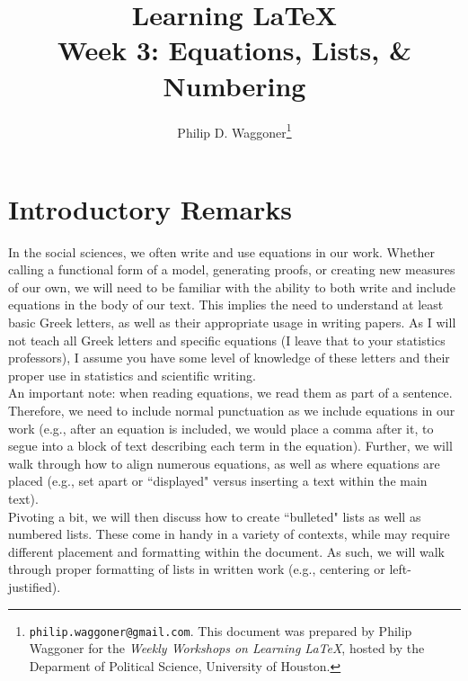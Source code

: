 \documentclass[11pt]{article}
\newcommand{\forceindent}{\leavevmode{\parindent=1.5em\indent}} %
\begin{document}
	
	\title{Learning \LaTeX \\
		\vspace{1cm}
	\large Week 3: Equations, Lists, \& Numbering \\ %
		\vspace{1cm}}
	\author{Philip D. Waggoner\footnote{{\texttt{philip.waggoner@gmail.com}}. This document was prepared by Philip Waggoner for the \textit{Weekly Workshops on Learning \LaTeX}, hosted by the Deparment of Political Science, University of Houston.}}
	\date{ } %
	\maketitle

\newpage

\tableofcontents

\newpage

\section{Introductory Remarks}
	
\forceindent In the social sciences, we often write and use equations in our work. Whether calling a functional form of a model, generating proofs, or creating new measures of our own, we will need to be familiar with the ability to both write and include equations in the body of our text. This implies the need to understand at least basic Greek letters, as well as their appropriate usage in writing papers. As I will not teach all Greek letters and specific equations (I leave that to your statistics professors), I assume you have some level of knowledge of these letters and their proper use in statistics and scientific writing. \\

An important note: when reading equations, we read them as part of a sentence. Therefore, we need to include normal punctuation as we include equations in our work (e.g., after an equation is included, we would place a comma after it, to segue into a block of text describing each term in the equation).  Further, we will walk through how to align numerous equations, as well as where equations are placed (e.g., set apart or ``displayed" versus inserting a text within the main text). \\

Pivoting a bit, we will then discuss how to create ``bulleted" lists as well as numbered lists. These come in handy in a variety of contexts, while may require different placement and formatting within the document. As such, we will walk through proper formatting of lists in written work (e.g., centering or left-justified). \\
\end{document}
